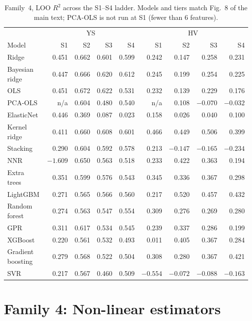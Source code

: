 \documentclass[a4paper,11pt]{article}
\newcommand{\familyfour}{Non-linear estimators}
\begin{document}
\begin{table}[H]
\centering
\caption{Family~4, LOO $R^2$ across the S1--S4 ladder. Models and tiers match Fig.~8 of the main text; PCA-OLS is not run at S1 (fewer than 6 features).}
\label{tab:f4_loo}
\small
\begin{tabular}{@{}lrrrr|rrrr@{}}
\toprule
& \multicolumn{4}{c|}{YS} & \multicolumn{4}{c}{HV} \\
Model & S1 & S2 & S3 & S4 & S1 & S2 & S3 & S4 \\
\midrule
Ridge            & 0.451  & 0.662 & 0.601 & 0.599 & 0.242 & 0.147 & 0.258 & 0.231 \\
Bayesian ridge   & 0.447  & 0.666 & 0.620 & 0.612 & 0.245 & 0.199 & 0.254 & 0.225 \\
OLS              & 0.451  & 0.672 & 0.622 & 0.531 & 0.232 & 0.139 & 0.229 & 0.176 \\
PCA-OLS          & n/a    & 0.604 & 0.480 & 0.540 & n/a   & 0.108 & $-0.070$ & $-0.032$ \\
ElasticNet       & 0.446  & 0.369 & 0.087 & 0.023 & 0.158 & 0.026 & 0.040 & 0.100 \\
Kernel ridge     & 0.411  & 0.660 & 0.608 & 0.601 & 0.466 & 0.449 & 0.506 & 0.399 \\
Stacking         & 0.290  & 0.604 & 0.592 & 0.578 & 0.213 & $-0.147$ & $-0.165$ & $-0.234$ \\
NNR              & $-1.609$ & 0.650 & 0.563 & 0.518 & 0.233 & 0.422 & 0.363 & 0.194 \\
Extra trees      & 0.351  & 0.599 & 0.576 & 0.543 & 0.345 & 0.336 & 0.367 & 0.298 \\
LightGBM         & 0.271  & 0.565 & 0.566 & 0.560 & 0.217 & 0.520 & 0.457 & 0.432 \\
Random forest    & 0.274  & 0.563 & 0.547 & 0.554 & 0.309 & 0.276 & 0.269 & 0.280 \\
GPR              & 0.311  & 0.617 & 0.534 & 0.545 & 0.239 & 0.337 & 0.286 & 0.199 \\
XGBoost          & 0.220  & 0.561 & 0.532 & 0.493 & 0.011 & 0.405 & 0.367 & 0.284 \\
Gradient boosting& 0.279  & 0.568 & 0.522 & 0.504 & 0.308 & 0.280 & 0.367 & 0.421 \\
SVR              & 0.217  & 0.567 & 0.460 & 0.509 & $-0.554$ & $-0.072$ & $-0.088$ & $-0.163$ \\
\bottomrule
\end{tabular}
\end{table}

\section{Family 4: \familyfour}
\label{si:ml}
\end{document}

